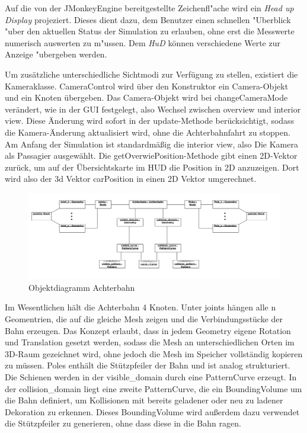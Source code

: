 Auf die von der JMonkeyEngine bereitgestellte Zeichenfl"ache wird ein \textsl{Head up Display} projeziert. Dieses dient dazu, dem Benutzer einen schnellen 
"Uberblick "uber den aktuellen Status der Simulation zu erlauben, ohne erst die Messwerte numerisch auswerten zu m"ussen. Dem \textsl{HuD} können verschiedene Werte zur
Anzeige "ubergeben werden.

Um zusätzliche unterschiedliche Sichtmodi zur Verfügung zu stellen, existiert die Kameraklasse. CameraControl wird über den Konstruktor ein Camera-Objekt und ein Knoten übergeben. Das Camera-Objekt wird bei changeCameraMode verändert, wie in der GUI festgelegt, also Wechsel zwischen overview und interior view. Diese Änderung wird sofort in der update-Methode berücksichtigt, sodass die Kamera-Änderung aktualisiert wird, ohne die Achterbahnfahrt zu stoppen. Am Anfang der Simulation ist standardmäßig die interior view, also Die Kamera als Passagier ausgewählt. Die getOverwiePosition-Methode gibt einen 2D-Vektor zurück, um auf der Übersichtskarte im HUD die Position in 2D anzuzeigen. Dort wird also der 3d Vektor carPosition in einen 2D Vektor umgerechnet.

\begin{figure}
\includegraphics[width=\linewidth]{bilder/objektdiagramm_004}
\caption{Objektdiagramm Achterbahn}
\label{fig:achterbahnObjects}
\end{figure}

Im Wesentlichen hält die Achterbahn 4 Knoten. Unter joints hängen alle n Geomentrien, die auf die gleiche Mesh zeigen und die Verbindungsstücke der Bahn erzeugen. Das Konzept erlaubt, dass in jedem Geometry eigene Rotation und Translation gesetzt werden, sodass die Mesh an unterschiedlichen Orten im 3D-Raum gezeichnet wird, ohne jedoch die Mesh im Speicher vollständig kopieren zu müssen. Poles enthält die Stützpfeiler der Bahn und ist analog strukturiert.
Die Schienen werden in der visible\_domain durch eine PatternCurve erzeugt. In der collision\_domain liegt eine zweite PatternCurve, die ein BoundingVolume um die Bahn definiert, um Kollisionen mit bereits geladener oder neu zu ladener Dekoration zu erkennen. Dieses BoundingVolume wird außerdem dazu verwendet die Stützpfeiler zu generieren, ohne dass diese in die Bahn ragen.

